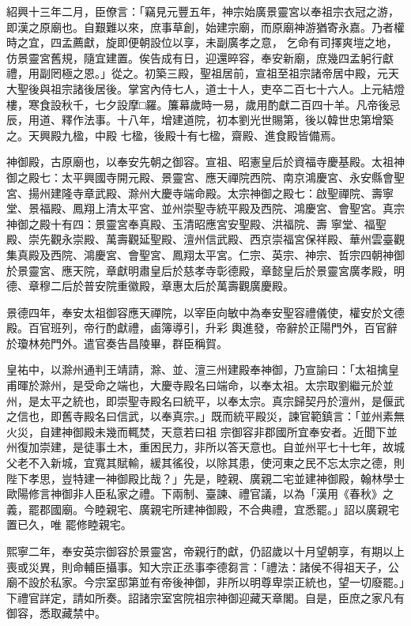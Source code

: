 \begin{pinyinscope}
 紹興十三年二月，臣僚言：「竊見元豐五年，神宗始廣景靈宮以奉祖宗衣冠之游，即漢之原廟也。自艱難以來，庶事草創，始建宗廟，而原廟神游猶寄永嘉。乃者權時之宜，四孟薦獻，旋即便朝設位以享，未副廣孝之意，
 乞命有司擇爽塏之地，仿景靈宮舊規，隨宜建置。俟告成有日，迎還晬容，奉安新廟，庶幾四孟躬行獻禮，用副罔極之恩。」從之。初築三殿，聖祖居前，宣祖至祖宗諸帝居中殿，元天大聖後與祖宗諸後居後。掌宮內侍七人，道士十人，吏卒二百七十六人。上元結燈樓，寒食設秋千，七夕設摩□羅。簾幕歲時一易，歲用酌獻二百四十羊。凡帝後忌辰，用道、釋作法事。十八年，增建道院，初本劉光世賜第，後以韓世忠第增築之。天興殿九楹，中殿
 七楹，後殿十有七楹，齋殿、進食殿皆備焉。



 神御殿，古原廟也，以奉安先朝之御容。宣祖、昭憲皇后於資福寺慶基殿。太祖神御之殿七：太平興國寺開元殿、景靈宮、應天禪院西院、南京鴻慶宮、永安縣會聖宮、揚州建隆寺章武殿、滁州大慶寺端命殿。太宗神御之殿七：啟聖禪院、壽寧堂、景福殿、鳳翔上清太平宮、並州崇聖寺統平殿及西院、鴻慶宮、會聖宮。真宗神御之殿十有四：景靈宮奉真殿、玉清昭應宮安聖殿、洪福院、壽
 寧堂、福聖殿、崇先觀永崇殿、萬壽觀延聖殿、澶州信武殿、西京崇福宮保祥殿、華州雲臺觀集真殿及西院、鴻慶宮、會聖宮、鳳翔太平宮。仁宗、英宗、神宗、哲宗四朝神御於景靈宮、應天院，章獻明肅皇后於慈孝寺彰德殿，章懿皇后於景靈宮廣孝殿，明德、章穆二后於普安院重徽殿，章惠太后於萬壽觀廣慶殿。



 景德四年，奉安太祖御容應天禪院，以宰臣向敏中為奉安聖容禮儀使，權安於文德殿。百官班列，帝行酌獻禮，鹵簿導引，升彩
 輿進發，帝辭於正陽門外，百官辭於瓊林苑門外。遣官奏告昌陵畢，群臣稱賀。



 皇祐中，以滁州通判王靖請，滁、並、澶三州建殿奉神御，乃宣諭曰：「太祖擒皇甫暉於滁州，是受命之端也，大慶寺殿名曰端命，以奉太祖。太宗取劉繼元於並州，是太平之統也，即崇聖寺殿名曰統平，以奉太宗。真宗歸契丹於澶州，是偃武之信也，即舊寺殿名曰信武，以奉真宗。」既而統平殿災，諫官範鎮言：「並州素無火災，自建神御殿未幾而輒焚，天意若曰祖
 宗御容非郡國所宜奉安者。近聞下並州復加崇建，是徒事土木，重困民力，非所以答天意也。自並州平七十七年，故城父老不入新城，宜寬其賦輸，緩其徭役，以除其患，使河東之民不忘太宗之德，則陛下孝思，豈特建一神御殿比哉？」先是，睦親、廣親二宅並建神御殿，翰林學士歐陽修言神御非人臣私家之禮。下兩制、臺諫、禮官議，以為「漢用《春秋》之義，罷郡國廟。今睦親宅、廣親宅所建神御殿，不合典禮，宜悉罷。」詔以廣親宅置已久，唯
 罷修睦親宅。



 熙寧二年，奉安英宗御容於景靈宮，帝親行酌獻，仍詔歲以十月望朝享，有期以上喪或災異，則命輔臣攝事。知大宗正丞事李德芻言：「禮法：諸侯不得祖天子，公廟不設於私家。今宗室邸第並有帝後神御，非所以明尊卑崇正統也，望一切廢罷。」下禮官詳定，請如所奏。詔諸宗室宮院祖宗神御迎藏天章閣。自是，臣庶之家凡有御容，悉取藏禁中。




\end{pinyinscope}
